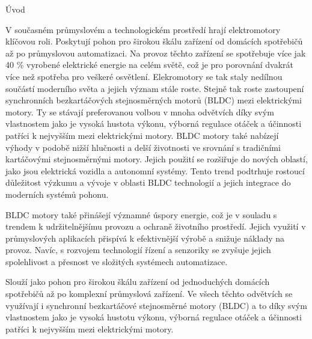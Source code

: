 
\chap Úvod



V současném průmyslovém a technologickém prostředí hrají elektromotory klíčovou roli. Poskytují pohon pro širokou 
škálu zařízení od domácích spotřebičů až po průmyslovou automatizaci.
Na provoz těchto zařízení se spotřebuje více jak 40 \% vyrobené elektrické energie na celém světě,
což je pro porovnání dvakrát více než spotřeba pro veškeré osvětlení. 
Elekromotory se tak staly nedílnou součástí moderního světa a jejich význam stále roste.
Stejně tak roste zastoupení synchronních bezkartáčových stejnosměrných motorů (BLDC) mezi elektrickými motory.
Ty se stávají preferovanou volbou v mnoha odvětvích díky svým vlastnostem jako je vysoká hustota výkonu, výborná 
regulace otáček a účinnosti patříci k nejvyšším mezi elektrickými motory.
BLDC motory také nabízejí výhody v podobě nižší hlučnosti a delší životnosti ve srovnání s tradičními kartáčovými 
stejnosměrnými motory. Jejich použití se rozšiřuje do nových oblastí, jako jsou elektrická vozidla a autonomní systémy. 
Tento trend podtrhuje rostoucí důležitost výzkumu a vývoje v oblasti BLDC technologií a jejich integrace do moderních systémů pohonu.

BLDC motory také přinášejí významné úspory energie, což je v souladu s trendem k udržitelnějšímu 
provozu a ochraně životního prostředí. Jejich využití v průmyslových aplikacích přispívá k efektivnější výrobě a snižuje náklady na provoz. 
Navíc, s rozvojem technologií řízení a senzoriky se zvyšuje jejich spolehlivost a přesnost ve složitých systémech automatizace. 




Slouží jako pohon pro širokou škálu zařízení od jednoduchých domácích spotřebičů
až po komplexní průmyslová zařízení.
Ve všech těchto odvětvích se využívají i synchronní bezkartáčové stejnosměrné motory (BLDC) a to díky
svým vlastnostem jako je vysoká hustotu výkonu, výborná regulace otáček a účinnosti patříci k nejvyšším 
mezi elektrickými motory. 


